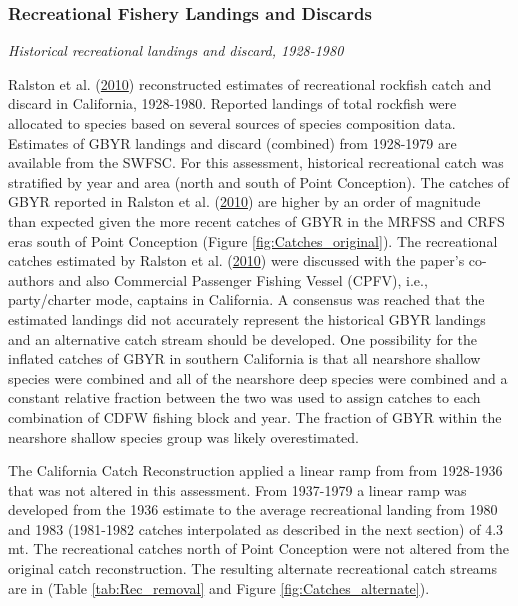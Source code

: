\documentclass[12pt,]{article}
\begin{document}
\subsubsection{Recreational Fishery Landings and
Discards}\label{recreational-fishery-landings-and-discards}

\emph{Historical recreational landings and discard, 1928-1980}

Ralston et al. (\protect\hyperlink{ref-Ralston2010}{2010}) reconstructed
estimates of recreational rockfish catch and discard in California,
1928-1980. Reported landings of total rockfish were allocated to species
based on several sources of species composition data. Estimates of GBYR
landings and discard (combined) from 1928-1979 are available from the
SWFSC. For this assessment, historical recreational catch was stratified
by year and area (north and south of Point Conception). The catches of
GBYR reported in Ralston et al.
(\protect\hyperlink{ref-Ralston2010}{2010}) are higher by an order of
magnitude than expected given the more recent catches of GBYR in the
MRFSS and CRFS eras south of Point Conception (Figure
\ref{fig:Catches_original}). The recreational catches estimated by
Ralston et al. (\protect\hyperlink{ref-Ralston2010}{2010}) were
discussed with the paper's co-authors and also Commercial Passenger
Fishing Vessel (CPFV), i.e., party/charter mode, captains in California.
A consensus was reached that the estimated landings did not accurately
represent the historical GBYR landings and an alternative catch stream
should be developed. One possibility for the inflated catches of GBYR in
southern California is that all nearshore shallow species were combined
and all of the nearshore deep species were combined and a constant
relative fraction between the two was used to assign catches to each
combination of CDFW fishing block and year. The fraction of GBYR within
the nearshore shallow species group was likely overestimated.

The California Catch Reconstruction applied a linear ramp from from
1928-1936 that was not altered in this assessment. From 1937-1979 a
linear ramp was developed from the 1936 estimate to the average
recreational landing from 1980 and 1983 (1981-1982 catches interpolated
as described in the next section) of 4.3 mt. The recreational catches
north of Point Conception were not altered from the original catch
reconstruction. The resulting alternate recreational catch streams are
in (Table \ref{tab:Rec_removal} and Figure \ref{fig:Catches_alternate}).
\end{document}
